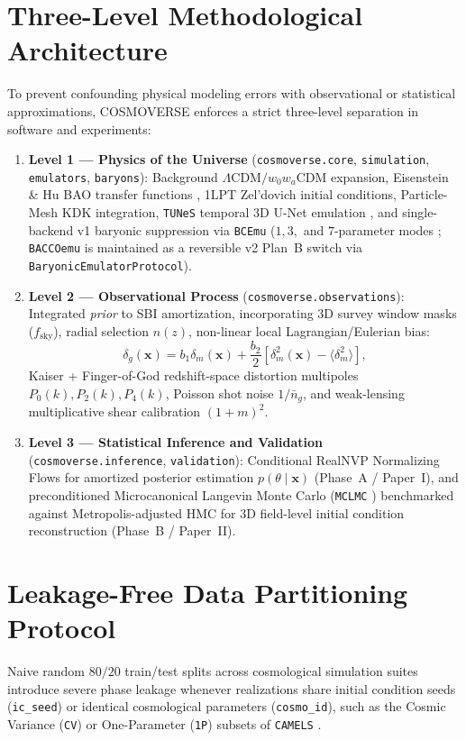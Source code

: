 \documentclass[twocolumn,10pt]{article}
\begin{document}
\section{Three-Level Methodological Architecture}
To prevent confounding physical modeling errors with observational or statistical approximations, COSMOVERSE enforces a strict three-level separation in software and experiments:
\begin{enumerate}
  \item \textbf{Level 1 --- Physics of the Universe} (\texttt{cosmoverse.core}, \texttt{simulation}, \texttt{emulators}, \texttt{baryons}): Background $\Lambda\mathrm{CDM}/w_0w_a\mathrm{CDM}$ expansion, Eisenstein \& Hu BAO transfer functions \cite{EisensteinHu1998}, 1LPT Zel'dovich initial conditions, Particle-Mesh KDK integration, \texttt{TUNeS} temporal 3D U-Net emulation \cite{TUNeS2026}, and single-backend v1 baryonic suppression via \texttt{BCEmu} ($1, 3,$ and $7$-parameter modes \cite{GiriSchneider2021}; \texttt{BACCOemu} \cite{Arico2021BACCO} is maintained as a reversible v2 Plan~B switch via \texttt{BaryonicEmulatorProtocol}).
  \item \textbf{Level 2 --- Observational Process} (\texttt{cosmoverse.observations}): Integrated \emph{prior} to SBI amortization, incorporating 3D survey window masks ($f_{\mathrm{sky}}$), radial selection $n(z)$, non-linear local Lagrangian/Eulerian bias:
  \begin{equation}
    \delta_g(\mathbf{x}) = b_1 \delta_m(\mathbf{x}) + \frac{b_2}{2}\!\left[\delta_m^2(\mathbf{x}) - \langle \delta_m^2 \rangle\right],
  \end{equation}
  Kaiser + Finger-of-God redshift-space distortion multipoles $P_0(k), P_2(k), P_4(k)$, Poisson shot noise $1/\bar{n}_g$, and weak-lensing multiplicative shear calibration $(1+m)^2$.
  \item \textbf{Level 3 --- Statistical Inference and Validation} (\texttt{cosmoverse.inference}, \texttt{validation}): Conditional RealNVP Normalizing Flows for amortized posterior estimation $p(\theta \mid \mathbf{x})$ (Phase~A / Paper~I), and preconditioned Microcanonical Langevin Monte Carlo (\texttt{MCLMC} \cite{Robnik2023MCLMC,SimonOnfroy2025JaxPMMCLMC}) benchmarked against Metropolis-adjusted HMC for 3D field-level initial condition reconstruction (Phase~B / Paper~II).
\end{enumerate}

\section{Leakage-Free Data Partitioning Protocol}
Naive random $80/20$ train/test splits across cosmological simulation suites introduce severe phase leakage whenever realizations share initial condition seeds (\texttt{ic\_seed}) or identical cosmological parameters (\texttt{cosmo\_id}), such as the Cosmic Variance (\texttt{CV}) or One-Parameter (\texttt{1P}) subsets of \texttt{CAMELS} \cite{VillaescusaNavarro2021CAMELS}.
\end{document}
